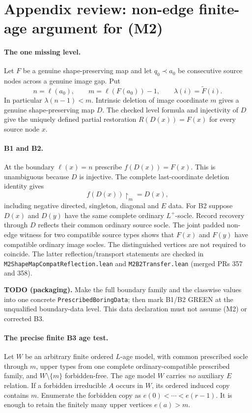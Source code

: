 
\section*{Appendix review: non-edge finite-age argument for (M2)}

\paragraph{The one missing level.}
Let $F$ be a genuine shape-preserving map and let $q_0\prec a_0$
be consecutive source nodes across a genuine image gap. Put
\[
 n=\ell(a_0),\qquad m=\ell(F(a_0))-1,\qquad
 \lambda(i)=\widetilde F(i).
\]
In particular $\lambda(n-1)<m$. Intrinsic deletion of image
coordinate $m$ gives a genuine shape-preserving map $D$. The checked
level formula and injectivity of $D$ give the uniquely defined partial
restoration $R(D(x))=F(x)$ for every source node $x$.

\paragraph{B1 and B2.}
At the boundary $\ell(x)=n$ prescribe $f(D(x))=F(x)$.
This is unambiguous because $D$ is injective. The complete
last-coordinate deletion identity gives
\[
 f(D(x))\restriction_m=D(x),
\]
including negative directed, singleton, diagonal and $E$ data.
For B2 suppose $D(x)$ and $D(y)$ have the same complete ordinary
$L^+$-socle. Record recovery through $D$ reflects their common
ordinary source socle. The joint padded non-edge witness for two
compatible source types shows that $F(x)$ and $F(y)$ have compatible
ordinary image socles. The distinguished vertices are not required
to coincide. The latter reflection/transport statements are checked
in \texttt{M2ShapeMapCompatReflection.lean} and
\texttt{M2B2Transfer.lean} (merged PRs 357 and 358).

\noindent\textbf{TODO (packaging).} Make the full boundary family and
the classwise values into one concrete
\texttt{PrescribedBoringData}; then mark B1/B2 GREEN at the
unqualified boundary-data level. This data declaration must
not assume (M2) or corrected B3.

\paragraph{The precise finite B3 age test.}
Let $W$ be an arbitrary finite ordered $L$-age model, with common
prescribed socle through $m$, upper types from one complete
ordinary-compatible prescribed family, and
$W\setminus\{m\}$ forbidden-free. The age model $W$ carries
\emph{no} auxiliary $E$ relation.
If a forbidden irreducible $A$ occurs in $W$, its ordered induced
copy contains $m$. Enumerate the forbidden copy as
$e(0)<\cdots<e(r-1)$. It is enough to retain the finitely many
upper vertices $e(a)>m$.

